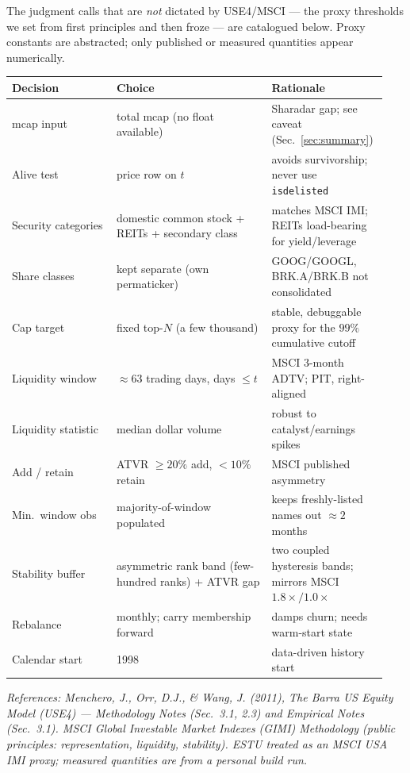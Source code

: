 \documentclass[11pt]{article}
\theoremstyle{definition}
\theoremstyle{plain}
\theoremstyle{remark}
\begin{document}
\smallskip
\noindent The judgment calls that are \emph{not} dictated by USE4/MSCI --- the proxy thresholds we set from first principles and then froze --- are catalogued below. Proxy constants are abstracted; only published or measured quantities appear numerically.

\begin{center}
\small
\begin{tabular}{@{}p{0.27\linewidth}p{0.40\linewidth}p{0.27\linewidth}@{}}
\toprule
Decision & Choice & Rationale \\
\midrule
mcap input & total mcap (no float available) & Sharadar gap; see caveat (Sec.\ \ref{sec:summary}) \\
Alive test & price row on $t$ & avoids survivorship; never use \texttt{isdelisted} \\
Security categories & domestic common stock + REITs + secondary class & matches MSCI IMI; REITs load-bearing for yield/leverage \\
Share classes & kept separate (own permaticker) & GOOG/GOOGL, BRK.A/BRK.B not consolidated \\
Cap target & fixed top-$N$ (a few thousand) & stable, debuggable proxy for the $99\%$ cumulative cutoff \\
Liquidity window & $\approx 63$ trading days, days $\le t$ & MSCI 3-month ADTV; PIT, right-aligned \\
Liquidity statistic & median dollar volume & robust to catalyst/earnings spikes \\
Add / retain & ATVR $\ge 20\%$ add, $< 10\%$ retain & MSCI published asymmetry \\
Min.\ window obs & majority-of-window populated & keeps freshly-listed names out $\approx 2$ months \\
Stability buffer & asymmetric rank band (few-hundred ranks) + ATVR gap & two coupled hysteresis bands; mirrors MSCI $1.8\times/1.0\times$ \\
Rebalance & monthly; carry membership forward & damps churn; needs warm-start state \\
Calendar start & 1998 & data-driven history start \\
\bottomrule
\end{tabular}
\end{center}

\begin{center}\small\itshape
References: Menchero, J., Orr, D.J., \& Wang, J. (2011), \emph{The Barra US Equity Model (USE4)} --- Methodology Notes (Sec.\ 3.1, 2.3) and Empirical Notes (Sec.\ 3.1). MSCI Global Investable Market Indexes (GIMI) Methodology (public principles: representation, liquidity, stability). ESTU treated as an MSCI USA IMI proxy; measured quantities are from a personal build run.
\end{center}
\end{document}
